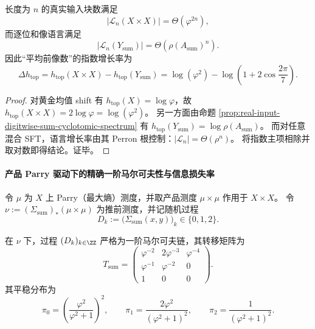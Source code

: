 \begin{corollary}\label{cor:real-input-digitwise-sum-topological-degeneracy}
长度为 $n$ 的真实输入块数满足
\[
|\mathcal{L}_n(X\times X)|=\Theta(\varphi^{2n}),
\]
而逐位和像语言满足
\[
|\mathcal{L}_n(Y_{\mathrm{sum}})|=\Theta(\rho(A_{\mathrm{sum}})^n).
\]
因此“平均前像数”的指数增长率为
\[
\Delta h_{\mathrm{top}}
=h_{\mathrm{top}}(X\times X)-h_{\mathrm{top}}(Y_{\mathrm{sum}})
=\log(\varphi^2)-\log\!\left(1+2\cos\frac{2\pi}{7}\right).
\]
\end{corollary}

\begin{proof}
对黄金均值 shift 有 $h_{\mathrm{top}}(X)=\log\varphi$，故 $h_{\mathrm{top}}(X\times X)=2\log\varphi=\log(\varphi^2)$。
另一方面由命题 \ref{prop:real-input-digitwise-sum-cyclotomic-spectrum} 有 $h_{\mathrm{top}}(Y_{\mathrm{sum}})=\log\rho(A_{\mathrm{sum}})$。
而对任意混合 SFT，语言增长率由其 Perron 根控制：$|\mathcal{L}_n|=\Theta(\rho^n)$。
将指数主项相除并取对数即得结论。证毕。
\end{proof}

\paragraph{产品 Parry 驱动下的精确一阶马尔可夫性与信息损失率}
令 $\mu$ 为 $X$ 上 Parry（最大熵）测度，并取产品测度 $\mu\times\mu$ 作用于 $X\times X$。
令 $\nu:=(\Sigma_{\mathrm{sum}})_\ast(\mu\times\mu)$ 为推前测度，并记随机过程
\[
D_k:=\bigl(\Sigma_{\mathrm{sum}}(x,y)\bigr)_k\in\{0,1,2\}.
\]

\begin{proposition}[推前过程的精确一阶马尔可夫性]\label{prop:real-input-digitwise-sum-parry-markov}
在 $\nu$ 下，过程 $(D_k)_{k\in\ZZ}$ 严格为一阶马尔可夫链，其转移矩阵为
\[
T_{\mathrm{sum}}=
\begin{pmatrix}
\varphi^{-2} & 2\varphi^{-3} & \varphi^{-4}\\
\varphi^{-1} & \varphi^{-2} & 0\\
1 & 0 & 0
\end{pmatrix}.
\]
其平稳分布为
\[
\pi_0=\left(\frac{\varphi^2}{\varphi^2+1}\right)^{\!2},\qquad
\pi_1=\frac{2\varphi^2}{(\varphi^2+1)^2},\qquad
\pi_2=\frac{1}{(\varphi^2+1)^2}.
\]
\end{proposition}

